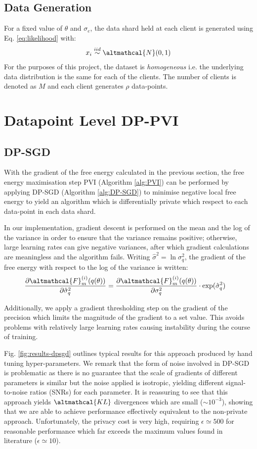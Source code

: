 \subsection{Data Generation}
For a fixed value of $\theta$ and $\sigma_e$, the data shard held at each client is generated using Eq. \eqref{eq:likelihood} with:
\begin{align}
x_i \stackrel{iid}{\sim} \altmathcal{N}(0, 1) \label{eq:data-gen}
\end{align}
For the purposes of this project, the dataset is \emph{homogeneous} i.e. the underlying data distribution is the same for each of the clients. The number of clients is denoted as $M$ and each client generates $\rho$ data-points.

\section{Datapoint Level DP-PVI}
\subsection{DP-SGD}
With the gradient of the free energy calculated in the previous section, the free energy maximisation step PVI (Algorithm \ref{alg:PVI}) can be performed by applying DP-SGD (Algorithm \ref{alg:DP-SGD}) to minimise negative local free energy to yield an algorithm which is differentially private which respect to each data-point in each data shard.

In our implementation, gradient descent is performed on the mean and the log of the variance in order to ensure that the variance remains positive; otherwise, large learning rates can give negative variances, after which gradient calculations are meaningless and the algorithm fails. Writing $\hat{\sigma}^2 = \ln \sigma_q^2$, the gradient of the free energy with respect to the log of the variance is written:
\begin{align}
\frac{\partial \altmathcal{F}_{m}^{(i)}(q(\theta))}{\partial \hat{\sigma}_q^2} &= \frac{\partial \altmathcal{F}_{m}^{(i)}(q(\theta))}{\partial \sigma_q^2} \cdot \exp(\hat{\sigma}_q^2)
\end{align}

Additionally, we apply a gradient thresholding step on the gradient of the precision which limits the magnitude of the gradient to a set value. This avoids problems with relatively large learning rates causing instability during the course of training. 

Fig. \ref{fig:results-dpsgd} outlines typical results for this approach produced by hand tuning hyper-parameters. We remark that the form of noise involved in DP-SGD is problematic as there is no guarantee that the scale of gradients of different parameters is similar but the noise applied is isotropic, yielding different signal-to-noise ratios (SNRs) for each parameter. It is reassuring to see that this approach yields $\altmathcal{KL}$ divergences which are small ($\sim 10^{-3}$), showing that we are able to achieve performance effectively equivalent to the non-private approach. Unfortunately, the privacy cost is very high, requiring $\epsilon \simeq 500$ for reasonable performance which far exceeds the maximum values found in literature ($\epsilon \simeq 10$). 

